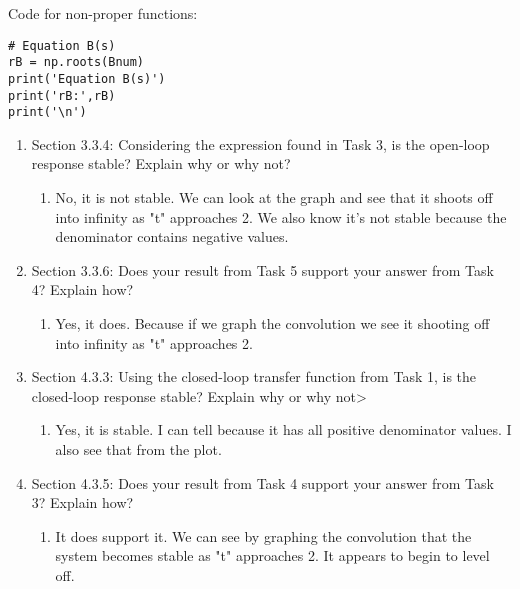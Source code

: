 \documentclass[12pt]{article}
\begin{document}
Code for non-proper functions:
\begin{lstlisting}
# Equation B(s)
rB = np.roots(Bnum)
print('Equation B(s)')
print('rB:',rB)
print('\n')
\end{lstlisting}

\begin{enumerate}
    \item Section 3.3.4: Considering the expression found in Task 3, is the open-loop response stable? Explain why
or why not?
    
    \begin{enumerate}
        \item No, it is not stable. We can look at the graph and see that it shoots off into infinity as "t" approaches 2. We also know it's not stable because the denominator contains negative values.
    \end{enumerate}
    
    \item  Section 3.3.6: Does your result from Task 5 support your answer from Task 4? Explain how?
    \begin{enumerate}
        \item Yes, it does. Because if we graph the convolution we see it shooting off into infinity as "t" approaches 2.
    \end{enumerate}
    \item Section 4.3.3: Using the closed-loop transfer function from Task 1, is the closed-loop response stable?
Explain why or why not>
    \begin{enumerate}
        \item Yes, it is stable. I can tell because it has all positive denominator values. I also see that from the plot.
    \end{enumerate}
    
    \item Section 4.3.5: Does your result from Task 4 support your answer from Task 3? Explain how?
    \begin{enumerate}
        \item It does support it. We can see by graphing the convolution that the system becomes stable as "t" approaches 2. It appears to begin to level off.
    \end{enumerate}
    
\end{enumerate}


\end{document}
